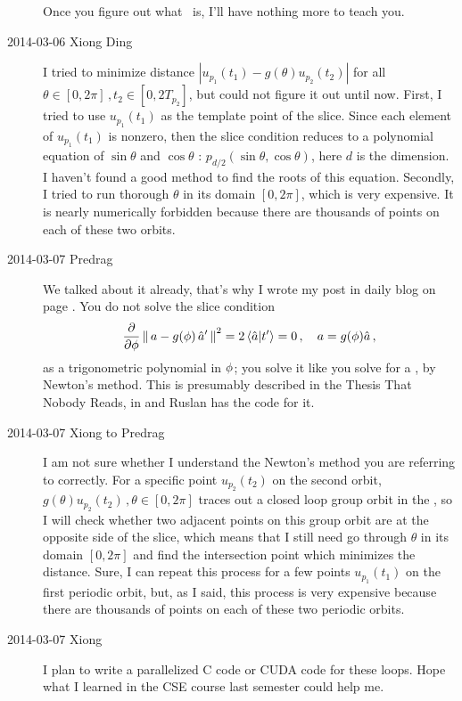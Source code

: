 \begin{description}
Once you figure out what \statesp\ is, I'll have nothing
more to teach you.

\item[2014-03-06 Xiong Ding]
I tried to minimize distance $|u_{p_1}(t_1)-g(\theta)u_{p_2}(t_2)|$ for all
$\theta\in[0,2\pi]\,, t_{2}\in [0,2T_{p_2}]$, but could not figure it out
until now. First, I tried to use $u_{p_1}(t_1)$ as the template point
of the slice. Since each element of $u_{p_1}(t_1)$ is nonzero,
then the slice condition reduces to a polynomial equation of
$\sin \theta$ and $\cos\theta$ : $p_{d/2}(\sin\theta, \cos\theta)$, here
$d$ is the dimension.
I haven't found a good method to find the roots of this equation.
Secondly, I tried to run thorough $\theta$ in its domain $[0,2\pi]$,
which is very expensive. It is nearly numerically forbidden because there
are thousands of points on each of these two orbits.

\item[2014-03-07 Predrag]
We talked about it already, that's why I wrote my post in daily blog
on page \pageref{2014-03-01PC}. You do not solve
the slice condition
\[
\frac{\partial}{\partial \gSpace} \norm{\ssp - \LieEl(\gSpace)\,\slicep}^2
   =
2\, \braket{\sspRed}{\sliceTan{}}
   = 0
        \,,\quad
\ssp = \LieEl(\gSpace) \sspRed
\,,
\]
as a trigonometric polynomial in ${\bf \phi}$; you solve it like you solve
for a {\PoincSec}, by Newton's method. This is presumably described in
the Thesis That Nobody Reads, in  and
Ruslan has the code for it.

\item[2014-03-07 Xiong to Predrag]
I am not sure whether I understand the Newton's method you
are referring to correctly. For a specific point $u_{p_2}(t_2)$ on
the second orbit, $g(\theta)u_{p_2}(t_2)\,, \theta\in [0,2\pi]$
traces out a closed loop group orbit in the {\statesp}, so I will check whether
two adjacent points on this group orbit are at the opposite side of
the slice, which means that I still need go through $\theta$ in its
domain $[0,2\pi]$ and find the intersection point
which minimizes the distance. Sure, I can repeat this process for a few
points $u_{p_1}(t_1)$ on the first periodic orbit, but, as I said,
 this process is very expensive because there
are thousands of points on each of these two periodic orbits.


\item[2014-03-07 Xiong]
I plan to write a parallelized C code or CUDA code for these loops. Hope
what I learned in the CSE course last semester could help me.


\end{description}
